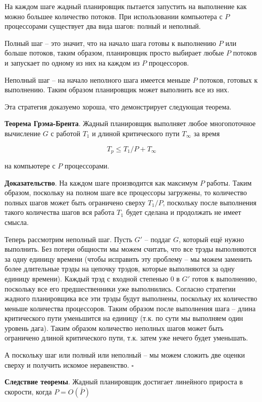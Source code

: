 \documentclass[a4paper,11pt]{article}
\begin{document}
На каждом шаге жадный планировщик пытается запустить на выполнение как можно
большее количество потоков. При использовании компьютера с $P$ процессорами
существует два вида шагов: полный и неполный.

Полный шаг -- это значит, что на начало шага готовы к выполнению $P$ или больше
потоков, таким образом, планировщик просто выбирает любые $P$ потоков и
запускает по одному из них на каждом из $P$ процессоров.

Неполный шаг -- на начало неполного шага имеется меньше $P$ потоков, готовых к
выполнению. Таким образом планировщик может выполнить все из них.

Эта стратегия доказуемо хороша, что  демонстрирует следующая теорема.

\textbf{Теорема Грэма-Брента}. Жадный планировщик выполняет любое многопоточное
вычисление $G$ с работой $T_1$ и длиной критического пути $T_{\infty}$ за время

$$
T_p \leqslant T_1 / P + T_{\infty}
$$

на компьютере с $P$ процессорами.

\textbf{Доказательство}. На каждом шаге производится как максимум $P$ работы.
Таким образом, поскольку на полном шаге все процессоры загружены, то количество
полных шагов может быть ограничено сверху $T_1 / P$, поскольку после выполнения
такого количества шагов вся работа $T_1$ будет сделана и продолжать не имеет
смысла.

Теперь рассмотрим неполный шаг. Пусть $G'$ -- поддаг $G$, который ещё нужно
выполнить. Без потери общности мы можем считать, что все трэды выполняются за
одну единицу времени (чтобы исправить эту проблему -- мы можем заменить более
длительные трэды на цепочку трэдов, которые выполняются за одну единицу
времени). Каждый трэд с входной степенью 0 в $G'$ готов к выполнению, поскольку
все его предшественники уже выполнились. Согласно стратегии жадного планировщика
все эти трэды будут выполнены, поскольку их количество меньше количества
процессоров. Таким образом после выполнения шага -- длина критического пути
уменьшится на единицу (т.к. по сути мы выполняем один уровень дага). Таким
образом количество неполных шагов может быть ограничено длиной критического
пути, т.к. затем уже нечего будет уменьшать.

А поскольку шаг или полный или неполный -- мы можем сложить две оценки сверху и
получить искомое неравенство. $\square$

\textbf{Следствие теоремы}. Жадный планировщик достигает линейного прироста в
скорости, когда $P = O(\bar{P})$
\end{document}
